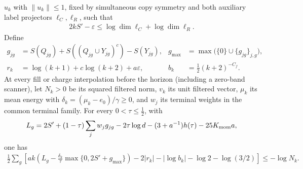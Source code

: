 \begin{lemma}
    $u_k$ with $\|u_k\|\leq1$, fixed by simultaneous copy symmetry and
    both auxiliary label projectors $\ell_C,\ell_R$, such that
    \begin{align}
        2kS'-\varepsilon
        \leq\log\dim\ell_C+\log\dim\ell_R.
        \label{eq:actual_scan_sharp_lower_label}
    \end{align}
    Define
    \begin{align}
        g_{jg}
            & =S(Q_{jg})+S((Q_{jg}\cup Y_{jg})^c)-S(Y_{jg}),
            & g_{\max}                                       & =\max\bigl(\{0\}\cup\{g_{jg}\}_{j,g}\bigr),
        \label{eq:actual_scan_sharp_lower_g}                                                               \\
        r_k & =\log(k+1)+c\log(k+2)+a\varepsilon,
            & b_k                                            & =\tfrac12(k+2)^{-C_f}.
        \label{eq:actual_scan_sharp_lower_rb}
    \end{align}
    At every fill or charge interpolation before the horizon (including a
    zero-band scanner), let $N_k>0$ be its squared filtered norm, $v_k$
    its unit filtered vector, $\mu_k$ its mean energy with
    $\delta_k=(\mu_k-e_0)/\gamma\geq0$, and $w_j$ its terminal weights in
    the common terminal family. For every $0<\tau\leq\tfrac12$, with
    \begin{align}
        L_g=2S'+(1-\tau)\sum_jw_jg_{jg}
        -2\tau\log d-(3+a^{-1})h(\tau)-25K_{\rm mom}a,
        \label{eq:actual_scan_sharp_lower_Lg}
    \end{align}
    one has
    \begin{align}
        \frac12\sum_g\left[
            ak\left(L_g-\frac{\delta_k}{\tau}
            \max\{0,2S'+g_{\max}\}\right)
            -2|r_k|-|\log b_k|-\log2-\log(3/2)
            \right]
        \leq-\log N_k.
        \label{eq:actual_scan_sharp_lower_bound}
    \end{align}
\end{lemma}

